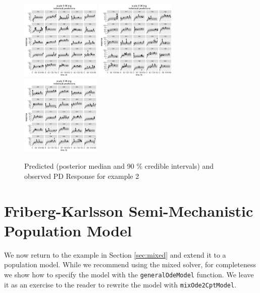 \documentclass[10pt, reqno, oneside]{amsbook}
\numberwithin{equation}{chapter}
\numberwithin{figure}{chapter}
\numberwithin{table}{chapter}
\theoremstyle{remark}
\begin{document}
\begin{figure}[!htb]
\includegraphics[width=1.5in,trim=0in 0in 0 0in]{graphics/effCptModelTorsten_0.82/effCptPlots028.pdf}
\includegraphics[width=1.5in,trim=0in 0in 0 0in]{graphics/effCptModelTorsten_0.82/effCptPlots029.pdf}
\includegraphics[width=1.5in,trim=0in 0in 0 0in]{graphics/effCptModelTorsten_0.82/effCptPlots030.pdf}
\caption{{Predicted (posterior median and 90 \% credible intervals) and observed PD Response for example 2}}
\label{effCptModelPredictionsPD}
\end{figure}

\section{Friberg-Karlsson Semi-Mechanistic Population Model}
\label{sec:orgb6d4dcd}
We now return to the example in Section \ref{sec:mixed} and extend
it to a population model. While we recommend using the mixed
solver, for completeness we show how to specify the model
with the \texttt{generalOdeModel} function. We leave it
as an exercise to the reader to rewrite the model with
\texttt{mixOde2CptModel}. 
\end{document}
